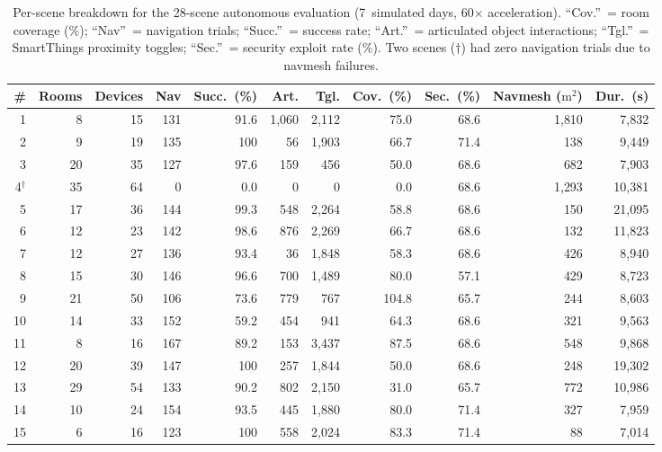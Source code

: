 \begin{table}[t]
  \centering
  \caption{Per-scene breakdown for the 28-scene autonomous evaluation (7~simulated days, 60$\times$ acceleration).
  ``Cov.''~= room coverage (\%); ``Nav''~= navigation trials; ``Succ.''~= success rate;
  ``Art.''~= articulated object interactions; ``Tgl.''~= SmartThings proximity toggles;
  ``Sec.''~= security exploit rate (\%).
  Two scenes ($\dagger$) had zero navigation trials due to navmesh failures.}
  \label{tab:per-scene}
  \footnotesize
  \begin{tabular}{r r r r r r r r r r r}
    \toprule
    {\#} & {Rooms} & {Devices} & {Nav} & {Succ.~(\%)} & {Art.} & {Tgl.} & {Cov.~(\%)} & {Sec.~(\%)} & {Navmesh ($\text{m}^2$)} & {Dur.~(s)} \\
    \midrule
     1 &  8 & 15 & 131 & 91.6 & 1{,}060 & 2{,}112 & 75.0 & 68.6 & 1{,}810 &  7{,}832 \\
     2 &  9 & 19 & 135 & 100  &     56 & 1{,}903 & 66.7 & 71.4 &    138 &  9{,}449 \\
     3 & 20 & 35 & 127 & 97.6 &    159 &    456 & 50.0 & 68.6 &    682 &  7{,}903 \\
     4$^\dagger$ & 35 & 64 &   0 &  0.0 &      0 &      0 &  0.0 & 68.6 & 1{,}293 & 10{,}381 \\
     5 & 17 & 36 & 144 & 99.3 &    548 & 2{,}264 & 58.8 & 68.6 &    150 & 21{,}095 \\
     6 & 12 & 23 & 142 & 98.6 &    876 & 2{,}269 & 66.7 & 68.6 &    132 & 11{,}823 \\
     7 & 12 & 27 & 136 & 93.4 &     36 & 1{,}848 & 58.3 & 68.6 &    426 &  8{,}940 \\
     8 & 15 & 30 & 146 & 96.6 &    700 & 1{,}489 & 80.0 & 57.1 &    429 &  8{,}723 \\
     9 & 21 & 50 & 106 & 73.6 &    779 &    767 & 104.8 & 65.7 &    244 &  8{,}603 \\
    10 & 14 & 33 & 152 & 59.2 &    454 &    941 & 64.3 & 68.6 &    321 &  9{,}563 \\
    11 &  8 & 16 & 167 & 89.2 &    153 & 3{,}437 & 87.5 & 68.6 &    548 &  9{,}868 \\
    12 & 20 & 39 & 147 & 100  &    257 & 1{,}844 & 50.0 & 68.6 &    248 & 19{,}302 \\
    13 & 29 & 54 & 133 & 90.2 &    802 & 2{,}150 & 31.0 & 65.7 &    772 & 10{,}986 \\
    14 & 10 & 24 & 154 & 93.5 &    445 & 1{,}880 & 80.0 & 71.4 &    327 &  7{,}959 \\
    15 &  6 & 16 & 123 & 100  &    558 & 2{,}024 & 83.3 & 71.4 &     88 &  7{,}014 \\

\end{tabular}
\end{table}
